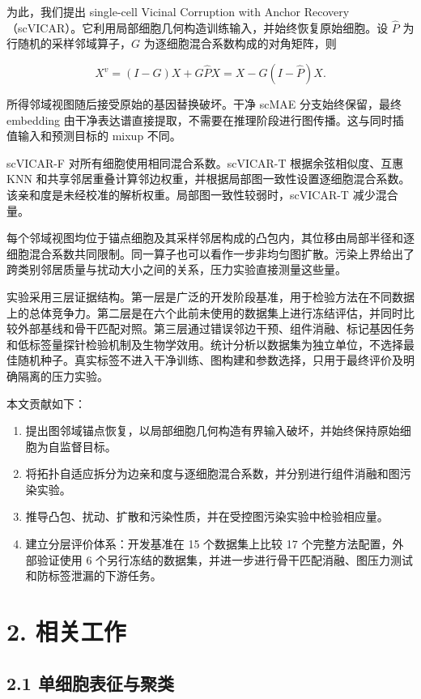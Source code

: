\documentclass[journal]{IEEEtran}
\begin{document}
为此，我们提出 single-cell Vicinal Corruption with Anchor Recovery（scVICAR）。它利用局部细胞几何构造训练输入，并始终恢复原始细胞。设 $\widehat P$ 为行随机的采样邻域算子，$G$ 为逐细胞混合系数构成的对角矩阵，则

\begin{equation}
X^v=(I-G)X+G\widehat PX=X-G(I-\widehat P)X.
\end{equation}

所得邻域视图随后接受原始的基因替换破坏。干净 scMAE 分支始终保留，最终 embedding 由干净表达谱直接提取，不需要在推理阶段进行图传播。这与同时插值输入和预测目标的 mixup 不同。

scVICAR-F 对所有细胞使用相同混合系数。scVICAR-T 根据余弦相似度、互惠 KNN 和共享邻居重叠计算邻边权重，并根据局部图一致性设置逐细胞混合系数。该亲和度是未经校准的解析权重。局部图一致性较弱时，scVICAR-T 减少混合量。

每个邻域视图均位于锚点细胞及其采样邻居构成的凸包内，其位移由局部半径和逐细胞混合系数共同限制。同一算子也可以看作一步非均匀图扩散。污染上界给出了跨类别邻居质量与扰动大小之间的关系，压力实验直接测量这些量。

实验采用三层证据结构。第一层是广泛的开发阶段基准，用于检验方法在不同数据上的总体竞争力。第二层是在六个此前未使用的数据集上进行冻结评估，并同时比较外部基线和骨干匹配对照。第三层通过错误邻边干预、组件消融、标记基因任务和低标签量探针检验机制及生物学效用。统计分析以数据集为独立单位，不选择最佳随机种子。真实标签不进入干净训练、图构建和参数选择，只用于最终评价及明确隔离的压力实验。

本文贡献如下：

\begin{enumerate}
\item 提出图邻域锚点恢复，以局部细胞几何构造有界输入破坏，并始终保持原始细胞为自监督目标。
\item 将拓扑自适应拆分为边亲和度与逐细胞混合系数，并分别进行组件消融和图污染实验。
\item 推导凸包、扰动、扩散和污染性质，并在受控图污染实验中检验相应量。
\item 建立分层评价体系：开发基准在 15 个数据集上比较 17 个完整方法配置，外部验证使用 6 个另行冻结的数据集，并进一步进行骨干匹配消融、图压力测试和防标签泄漏的下游任务。
\end{enumerate}

\section{2. 相关工作}

\subsection{2.1 单细胞表征与聚类}
\end{document}
